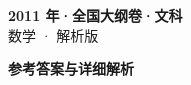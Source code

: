 \documentclass[zihao=-4, a4paper]{ctexart}
\begin{document}
\begin{center}
  {\Large\bfseries 2011 年·全国大纲卷·文科}\\[4pt]
  {\large 数学 · 解析版}
\end{center}
\medskip
{}

\clearpage
{}
\begin{center}{\Large\bfseries 参考答案与详细解析}\end{center}
\medskip

\end{document}
